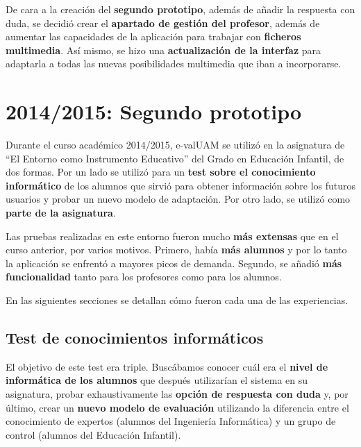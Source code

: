 De cara a la creación del \textbf{ segundo prototipo}, además de añadir la respuesta con duda, se decidió crear el \textbf{apartado de gestión del profesor}, además de aumentar las capacidades de la aplicación para trabajar con \textbf{ficheros multimedia}. Así mismo, se hizo una \textbf{actualización de la interfaz} para adaptarla a todas las nuevas posibilidades multimedia que iban a incorporarse.

\section{2014/2015: Segundo prototipo}

Durante el curso académico 2014/2015, \acrshort{e-valUAM} se utilizó en la asignatura de ``El Entorno como Instrumento Educativo'' del Grado en Educación Infantil, de dos formas. Por un lado se utilizó para un \textbf{test sobre el conocimiento informático} de los alumnos que sirvió para obtener información sobre los futuros usuarios y probar un nuevo modelo de adaptación. Por otro lado, se utilizó como \textbf{ parte de la asignatura}.

Las pruebas realizadas en este entorno fueron mucho \textbf{más extensas} que en el curso anterior, por varios motivos. Primero, había \textbf{más alumnos} y por lo tanto la aplicación se enfrentó a mayores picos de demanda. Segundo, se añadió \textbf{más funcionalidad} tanto para los profesores como para los alumnos.

En las siguientes secciones se detallan cómo fueron cada una de las experiencias.

\subsection{Test de conocimientos informáticos}

El objetivo de este test era triple. Buscábamos conocer cuál era el\textbf{ nivel de informática de los alumnos} que después utilizarían el sistema en su asignatura, probar exhaustivamente las \textbf{opción de respuesta con duda} y, por último, crear un \textbf{nuevo modelo de evaluación} utilizando la diferencia entre el conocimiento de expertos (alumnos del Ingeniería Informática) y un grupo de control (alumnos del Educación Infantil).

